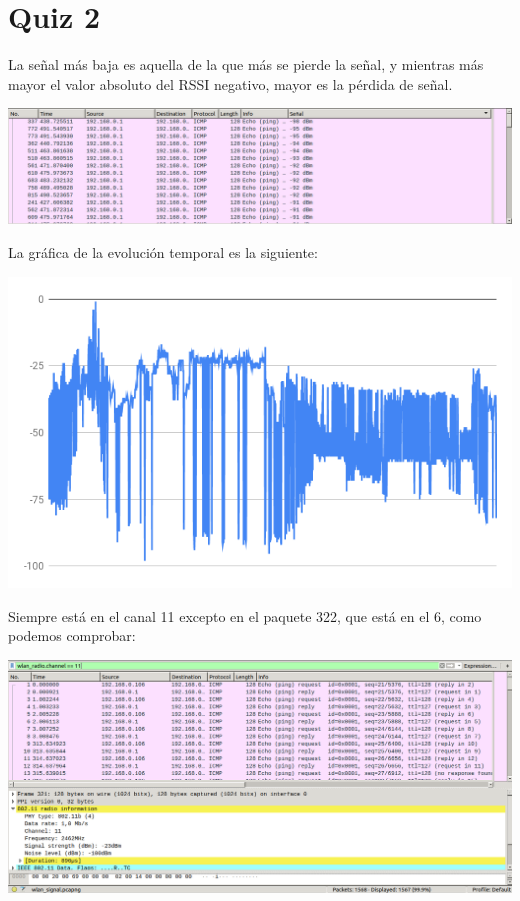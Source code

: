 \documentclass{article}
\begin{document}
\section{Quiz 2}

La señal más baja es aquella de la que más se pierde la señal, y mientras más mayor el valor absoluto del RSSI negativo, mayor es la pérdida de señal.

\begin{center}
\includegraphics[scale=0.3]{WLAN/signal.png} 
\end{center}

La gráfica de la evolución temporal es la siguiente:

\begin{center}
\includegraphics[scale=0.3]{WLAN/chart.png} 
\end{center}

Siempre está en el canal 11 excepto en el paquete 322, que está en el 6, como podemos comprobar:

\begin{center}
\includegraphics[scale=0.3]{WLAN/channel11.png} 
\end{center}
\end{document}
